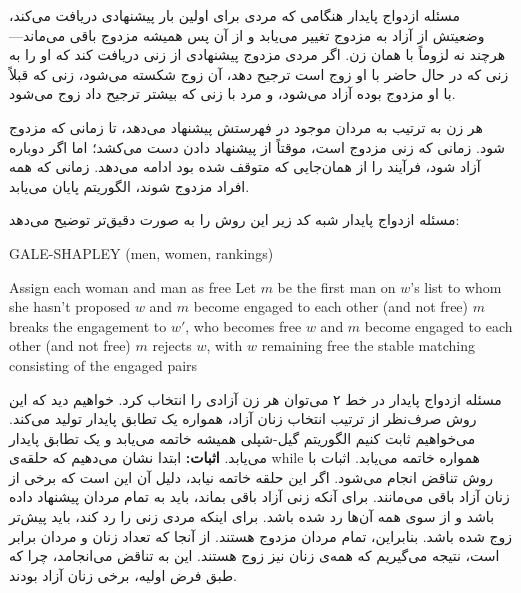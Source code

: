 \begin{itemframe}{مسئله ازدواج پایدار}
\itm
هنگامی که مردی برای اولین بار پیشنهادی دریافت می‌کند، وضعیتش از آزاد به مزدوج تغییر می‌یابد و از آن پس همیشه مزدوج باقی می‌ماند—هرچند نه لزوماً با همان زن.
\itm
 اگر مردی مزدوج پیشنهادی از زنی دریافت کند که او را به زنی که در حال حاضر با او زوج است ترجیح دهد، آن زوج شکسته می‌شود، زنی که قبلاً با او مزدوج بوده آزاد می‌شود، و مرد با زنی که بیشتر ترجیح داد زوج می‌شود.

\itm
هر زن به ترتیب به مردان موجود در فهرستش پیشنهاد می‌دهد، تا زمانی که مزدوج شود. زمانی که زنی مزدوج است، موقتاً از پیشنهاد دادن دست می‌کشد؛ اما اگر دوباره آزاد شود، فرآیند را از همان‌جایی که متوقف شده بود ادامه می‌دهد.
\itm
زمانی که همه افراد مزدوج شوند، الگوریتم پایان می‌یابد.
\end{itemframe}


\begin{itemframe}{مسئله ازدواج پایدار}
\itm
شبه کد زیر این روش را به صورت دقیق‌تر توضیح می‌دهد:
\begin{algorithm}[H]\alglr
\caption{GALE-SHAPLEY (men, women, rankings)}
\begin{algorithmic}[1]
\State Assign each woman and man as free
    \State Let $m$ be the first man on $w$’s list to whom she hasn't proposed
        \State $w$ and $m$ become engaged to each other (and not free)
        \State $m$ breaks the engagement to $w'$, who becomes free
        \State $w$ and $m$ become engaged to each other (and not free)
    \Else
        \State $m$ rejects $w$, with $w$ remaining free
    \EndIf
\EndWhile
\State \Return the stable matching consisting of the engaged pairs
\end{algorithmic}
\end{algorithm}

\end{itemframe}


\begin{itemframe}{مسئله ازدواج پایدار}
\itm
در خط ۲ می‌توان هر زن آزادی را انتخاب کرد. خواهیم دید که این روش صرف‌نظر از ترتیب انتخاب زنان آزاد، همواره یک تطابق پایدار تولید می‌کند.
\itm
‌می‌خواهیم ثابت کنیم الگوریتم گیل-شپلی همیشه خاتمه می‌یابد و یک تطابق پایدار می‌یابد.
\itm
\textbf{اثبات:}
 ابتدا نشان می‌دهیم که حلقه‌ی while همواره خاتمه می‌یابد. اثبات با روش تناقض انجام می‌شود. اگر این حلقه خاتمه نیابد، دلیل آن این است که برخی از زنان آزاد باقی می‌مانند. برای آنکه زنی آزاد باقی بماند، باید به تمام مردان پیشنهاد داده باشد و از سوی همه آن‌ها رد شده باشد.
\itm
 برای اینکه مردی زنی را رد کند، باید پیش‌تر زوج شده باشد. بنابراین، تمام مردان مزدوج هستند. از آنجا که تعداد زنان و مردان برابر است، نتیجه می‌گیریم که همه‌ی زنان نیز زوج هستند. این به تناقض می‌انجامد، چرا که طبق فرض اولیه، برخی زنان آزاد بودند.
\end{itemframe}


